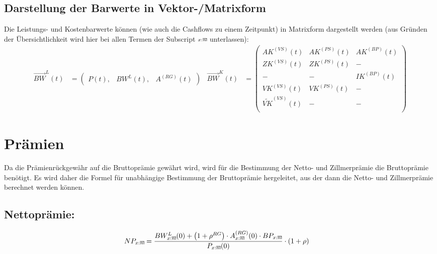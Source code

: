\documentclass[a4paper,10pt]{article}
\makeatletter
\newcommand{\xn}{{\act[x]{n}}}
\DeclareRobustCommand{\act}[2][]{%
\def\arraystretch{0}%
\setlength\arraycolsep{0.5pt}%
\setlength\arrayrulewidth{0.5pt}%
\setbox0=\hbox{$\scriptstyle#1\ifx#1\empty{asdf}\else:\fi#2$}%
\begin{array}[b]{*2{@{}>{\scriptstyle}c}|}
\cline{2-2}%
\rule[1.25pt]{0pt}{\ht0}%
#1\ifx#1\empty\else:\fi & #2%
\end{array}%
}
\makeatother
\begin{document}
\subsection{Darstellung der Barwerte in Vektor-/Matrixform}
Die Leistungs- und Kostenbarwerte können (wie auch die Cashflows zu einem Zeitpunkt) 
in Matrixform dargestellt werden (aus Gründen der Übersichtlichkeit wird hier bei 
allen Termen der Subscript $\xn$ unterlassen):
\begin{align*}
  \overrightarrow{BW}^L(t) &= \left(
 \begin{matrix}
    P(t), & %
    BW^L(t), & A^{(RG)}(t)
 \end{matrix}
 \right)
% 
 &
%  
 \overrightarrow{BW}^K(t) &= \left(
 \begin{matrix}
AK^{(VS)}(t) & AK^{(PS)}(t)  & AK^{(BP)}(t) \\
% 
ZK^{(VS)}(t) & ZK^{(PS)}(t)  & -\\
% 
- & - & IK^{(BP)}(t) \\
% 
VK^{(VS)}(t) & VK^{(PS)}(t) & -\\
\widetilde{VK}^{(VS)}(t) & - & -\\  
 \end{matrix}
 \right)
% 
\end{align*}



\pagebreak

\section{Prämien}

Da die Prämienrückgewähr auf die Bruttoprämie gewährt wird, wird für die Bestimmung der Netto- und Zillmerprämie die Bruttoprämie benötigt. Es wird daher die Formel für unabhängige Bestimmung der Bruttoprämie hergeleitet, aus der dann die Netto- und Zillmerprämie berechnet werden können.

\subsection{Nettoprämie:}
\begin{align*}
NP_\xn &= \frac{%
BW^{L}_\xn(0) + \left(1+\rho^{RG}\right) \cdot A^{(RG)}_\xn(0) \cdot BP_\xn}
{P_\xn(0)} \cdot \left(1+\rho\right)
\end{align*}
\end{document}
